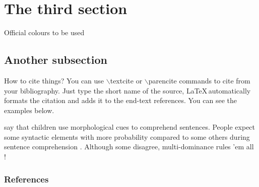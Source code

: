 \documentclass[aspectratio=43]{beamer}
\begin{document}
\section{The third section}

\begin{frame}[t]{Official colours to be used}
\end{frame}

\subsection{Another subsection}

\begin{frame}[t]{How to cite things?}
\justify
You can use $\backslash$textcite or $\backslash$parencite commands to cite from your bibliography. Just type the short name of the source, \LaTeX\,automatically formats the citation and adds it to the end-text references. You can see the examples below.

\vspace{1cm}
    \textcite{ozge2019wait} say that children use morphological cues to comprehend sentences. People expect some syntactic elements with more probability compared to some others during sentence comprehension \parencite{levy2008expectation}. Although some disagree, multi-dominance rules 'em all \parencite{citko2021merge, chomsky2014minimalist}!
\end{frame}

\begin{frame}[t]
\frametitle{References}
    \printbibliography
\end{frame}

\makethanks%

\end{document}
